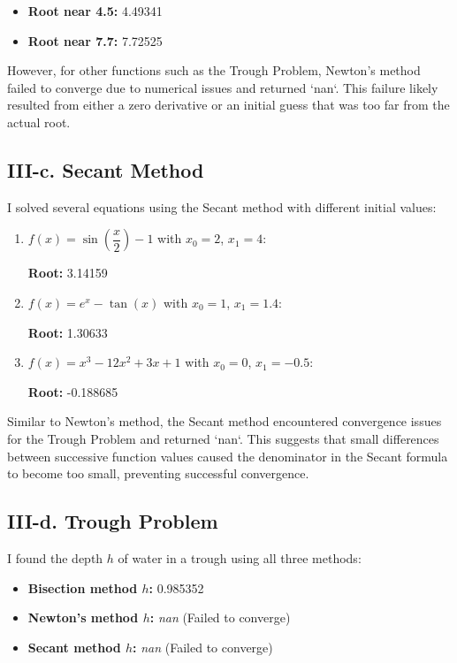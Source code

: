 \documentclass[a4paper]{article}
\begin{document}
\begin{itemize}
    \item \textbf{Root near 4.5:} 4.49341
    \item \textbf{Root near 7.7:} 7.72525
\end{itemize}

However, for other functions such as the Trough Problem, Newton's method failed to converge due to numerical issues and returned `nan`. This failure likely resulted from either a zero derivative or an initial guess that was too far from the actual root.

\subsection*{III-c. Secant Method}

I solved several equations using the Secant method with different initial values:

\begin{enumerate}
    \item $f(x) = \sin\left(\dfrac{x}{2}\right) - 1$ with $x_0 = 2$, $x_1 = 4$:

    \textbf{Root:} 3.14159

    \item $f(x) = e^{x} - \tan(x)$ with $x_0 = 1$, $x_1 = 1.4$:

    \textbf{Root:} 1.30633

    \item $f(x) = x^3 - 12x^2 + 3x + 1$ with $x_0 = 0$, $x_1 = -0.5$:

    \textbf{Root:} -0.188685
\end{enumerate}

Similar to Newton's method, the Secant method encountered convergence issues for the Trough Problem and returned `nan`. This suggests that small differences between successive function values caused the denominator in the Secant formula to become too small, preventing successful convergence.

\subsection*{III-d. Trough Problem}

I found the depth $h$ of water in a trough using all three methods:

\begin{itemize}
    \item \textbf{Bisection method $h$:} 0.985352
    \item \textbf{Newton's method $h$:} \textit{nan} (Failed to converge)
    \item \textbf{Secant method $h$:} \textit{nan} (Failed to converge)
\end{itemize}
\end{document}
